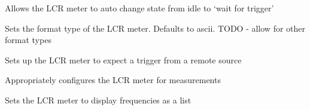 \documentclass[letterpaper,10pt,english]{sphinxmanual}
\begin{document}
\begin{fulllineitems}
\begin{fulllineitems}
\end{fulllineitems}


\begin{fulllineitems}
\label{\detokenize{drivers:drivers.LCR._set_continuous}}
Allows the LCR meter to auto change state from idle to ‘wait for trigger’

\end{fulllineitems}


\begin{fulllineitems}
\label{\detokenize{drivers:drivers.LCR._set_format}}
Sets the format type of the LCR meter. Defaults to ascii. TODO - allow for other format types

\end{fulllineitems}


\begin{fulllineitems}
\label{\detokenize{drivers:drivers.LCR._set_source}}
Sets up the LCR meter to expect a trigger from a remote source

\end{fulllineitems}


\begin{fulllineitems}
\label{\detokenize{drivers:drivers.LCR.configure}}
Appropriately configures the LCR meter for measurements

\end{fulllineitems}


\begin{fulllineitems}
\label{\detokenize{drivers:drivers.LCR.display}}
Sets the LCR meter to display frequencies as a list


\end{fulllineitems}
\end{fulllineitems}
\end{document}
